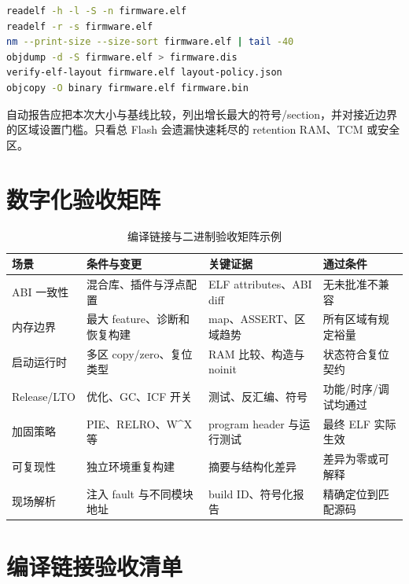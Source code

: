 \begin{minipage}{\linewidth}
\begin{lstlisting}[language=bash,caption={固件布局的自动检查示意}]
readelf -h -l -S -n firmware.elf
readelf -r -s firmware.elf
nm --print-size --size-sort firmware.elf | tail -40
objdump -d -S firmware.elf > firmware.dis
verify-elf-layout firmware.elf layout-policy.json
objcopy -O binary firmware.elf firmware.bin
\end{lstlisting}
\end{minipage}

自动报告应把本次大小与基线比较，列出增长最大的符号/section，并对接近边界的区域设置门槛。只看总 Flash 会遗漏快速耗尽的 retention RAM、TCM 或安全区。

\section{数字化验收矩阵}

\begin{table}[H]
  \centering
  \caption{编译链接与二进制验收矩阵示例}
  \begin{tabular}{p{29mm}p{41mm}p{39mm}p{31mm}}
    \hline
    场景 & 条件与变更 & 关键证据 & 通过条件 \\
    \hline
    ABI 一致性 & 混合库、插件与浮点配置 & ELF attributes、ABI diff & 无未批准不兼容 \\
    内存边界 & 最大 feature、诊断和恢复构建 & map、ASSERT、区域趋势 & 所有区域有规定裕量 \\
    启动运行时 & 多区 copy/zero、复位类型 & RAM 比较、构造与 noinit & 状态符合复位契约 \\
    Release/LTO & 优化、GC、ICF 开关 & 测试、反汇编、符号 & 功能/时序/调试均通过 \\
    加固策略 & PIE、RELRO、W\textasciicircum X 等 & program header 与运行测试 & 最终 ELF 实际生效 \\
    可复现性 & 独立环境重复构建 & 摘要与结构化差异 & 差异为零或可解释 \\
    现场解析 & 注入 fault 与不同模块地址 & build ID、符号化报告 & 精确定位到匹配源码 \\
    \hline
  \end{tabular}
\end{table}

\section{编译链接验收清单}

